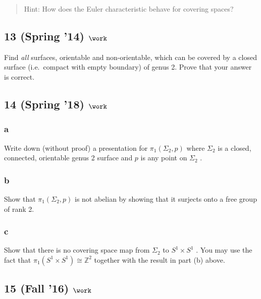 \begin{quote}
Hint: How does the Euler characteristic behave for covering spaces?
\end{quote}

\hypertarget{spring-14-work-2}{%
\subsection{\texorpdfstring{13 (Spring '14)
\(\work\)}{13 (Spring '14) \textbackslash work}}\label{spring-14-work-2}}

Find \emph{all} surfaces, orientable and non-orientable, which can be
covered by a closed surface (i.e.~compact with empty boundary) of genus
2. Prove that your answer is correct.

\hypertarget{spring-18-work-2}{%
\subsection{\texorpdfstring{14 (Spring '18)
\(\work\)}{14 (Spring '18) \textbackslash work}}\label{spring-18-work-2}}

\hypertarget{a-4}{%
\subsubsection{a}\label{a-4}}

Write down (without proof) a presentation for \(\pi_1 (\Sigma_2 , p)\)
where \(\Sigma_2\) is a closed, connected, orientable genus 2 surface
and \(p\) is any point on \(\Sigma_2\) .

\hypertarget{b-4}{%
\subsubsection{b}\label{b-4}}

Show that \(\pi_1 (\Sigma_2 , p)\) is not abelian by showing that it
surjects onto a free group of rank 2.

\hypertarget{c-1}{%
\subsubsection{c}\label{c-1}}

Show that there is no covering space map from \(\Sigma_2\) to
\(S^1 \times S^1\) . You may use the fact that
\(\pi_1 (S^1 \times S^1 ) \cong {\mathbb{Z}}^2\) together with the
result in part (b) above.

\hypertarget{fall-16-work-6}{%
\subsection{\texorpdfstring{15 (Fall '16)
\(\work\)}{15 (Fall '16) \textbackslash work}}\label{fall-16-work-6}}

